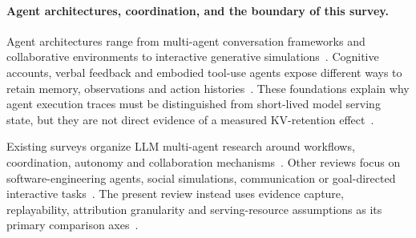 \paragraph{Agent architectures, coordination, and the boundary of this survey.}
Agent architectures range from multi-agent conversation frameworks and collaborative environments to interactive generative simulations~\cite{ext065,ext066,ext067}.
Cognitive accounts, verbal feedback and embodied tool-use agents expose different ways to retain memory, observations and action histories~\cite{ext068,ext071}.
These foundations explain why agent execution traces must be distinguished from short-lived model serving state, but they are not direct evidence of a measured KV-retention effect~\cite{ext080,ext081}.

Existing surveys organize LLM multi-agent research around workflows, coordination, autonomy and collaboration mechanisms~\cite{ext035,ext043,ext045,ext046,ext076}.
Other reviews focus on software-engineering agents, social simulations, communication or goal-directed interactive tasks~\cite{ext077,ext078,ext079,ext096}.
The present review instead uses evidence capture, replayability, attribution granularity and serving-resource assumptions as its primary comparison axes~\cite{ext103,ext104,ext110,ext112}.

